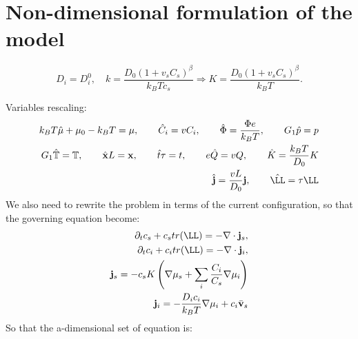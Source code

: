 \section{Non-dimensional formulation of the model}
\begin{equation}
D_i=D_i^0,\quad k = \frac{D_0(1+v_sC_s)^\beta}{k_B T c_s} \Rightarrow K=  \frac{D_0(1+v_sC_s)^\beta}{k_B T}.
\end{equation}

Variables rescaling:
\begin{equation*}
\begin{aligned}
k_BT\hat{\mu} + \mu_0 -k_BT= \mu, \qquad \hat{C}_i = vC_i, \qquad \hat{\Phi} = \frac{\Phi e}{k_B T}, \qquad  G_1\hat{p}= p\\
G_1\hat{\mathbb{T}}=\mathbb{T}, \qquad\hat{\mathbf{x}} L =\mathbf{x}, \qquad \hat{t}\tau=t, \qquad e\hat{Q} =v Q, \qquad \hat{K} = \frac{k_BT}{D_0}K\\
\hat{\mathbf{j}}=\frac{vL}{D_0}\mathbf{j}, \qquad \hat{\LL}= \tau \LL
\end{aligned}
\end{equation*}
We also need to rewrite the problem in terms of the current configuration, so that the governing equation become:
\begin{eqnarray}
\partial_t c_s + c_s tr(\LL)=-\nabla \cdot\mathbf{j}_s,\\
\partial_t c_i + c_i tr(\LL)= -\nabla\cdot\mathbf{j}_i,\\
\mathbf{j}_s =-c_sK  \left(\nabla \mu_s +\sum_i \frac{C_i}{C_s} \nabla \mu_i\right)\\
\mathbf{j}_i= - \frac{D_ic_i}{k_B T}\nabla \mu_i + c_i\bar{\mathbf{v}}_s
\end{eqnarray}
So that the a-dimensional set of equation is:
